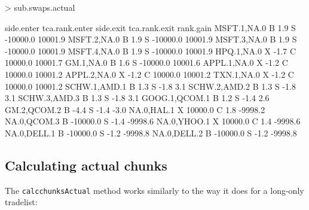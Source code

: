 \documentclass{article}
\begin{document}
\begin{Schunk}
\begin{Sinput}
> sub.swaps.actual
\end{Sinput}
\begin{Soutput}
              side.enter tca.rank.enter side.exit tca.rank.exit rank.gain
MSFT.1,NA.0            B            1.9         S      -10000.0   10001.9
MSFT.2,NA.0            B            1.9         S      -10000.0   10001.9
MSFT.3,NA.0            B            1.9         S      -10000.0   10001.9
MSFT.4,NA.0            B            1.9         S      -10000.0   10001.9
HPQ.1,NA.0             X           -1.7         C       10000.0   10001.7
GM.1,NA.0              B            1.6         S      -10000.0   10001.6
APPL.1,NA.0            X           -1.2         C       10000.0   10001.2
APPL.2,NA.0            X           -1.2         C       10000.0   10001.2
TXN.1,NA.0             X           -1.2         C       10000.0   10001.2
SCHW.1,AMD.1           B            1.3         S          -1.8       3.1
SCHW.2,AMD.2           B            1.3         S          -1.8       3.1
SCHW.3,AMD.3           B            1.3         S          -1.8       3.1
GOOG.1,QCOM.1          B            1.2         S          -1.4       2.6
GM.2,QCOM.2            B           -4.4         S          -1.4      -3.0
NA.0,HAL.1             X        10000.0         C           1.8   -9998.2
NA.0,QCOM.3            B       -10000.0         S          -1.4   -9998.6
NA.0,YHOO.1            X        10000.0         C           1.4   -9998.6
NA.0,DELL.1            B       -10000.0         S          -1.2   -9998.8
NA.0,DELL.2            B       -10000.0         S          -1.2   -9998.8
\end{Soutput}
\end{Schunk}




\subsection{Calculating actual chunks}

The \texttt{calcchunksActual} method works similarly to the way it
does for a long-only tradelist:
\end{document}
